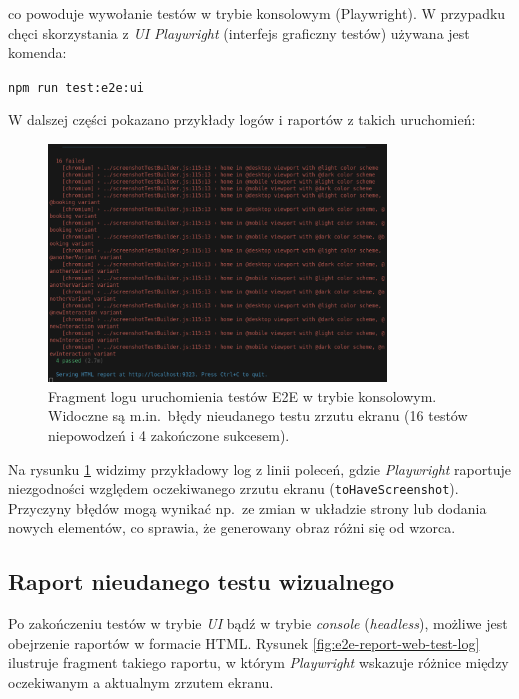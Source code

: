 \documentclass[12pt]{report}
\begin{document}
co powoduje wywołanie testów w trybie konsolowym (Playwright). W przypadku chęci skorzystania z \emph{UI} \emph{Playwright} (interfejs graficzny testów) używana jest komenda:

\begin{center}
\texttt{npm run test:e2e:ui}
\end{center}

W dalszej części pokazano przykłady logów i raportów z takich uruchomień:

\begin{figure}[H]
\centering
\includegraphics[width=0.80\textwidth]{e2e_console_test_log.png}
\caption{Fragment logu uruchomienia testów E2E w trybie konsolowym. Widoczne są m.in.\ błędy nieudanego testu zrzutu ekranu (16 testów niepowodzeń i 4 zakończone sukcesem).}
\label{fig:e2e-console-test-log}
\end{figure}

Na rysunku \ref{fig:e2e-console-test-log} widzimy przykładowy log z linii poleceń, gdzie \emph{Playwright} raportuje niezgodności względem oczekiwanego zrzutu ekranu (\texttt{toHaveScreenshot}). Przyczyny błędów mogą wynikać np.\ ze zmian w układzie strony lub dodania nowych elementów, co sprawia, że generowany obraz różni się od wzorca.

\subsection*{Raport nieudanego testu wizualnego}
Po zakończeniu testów w trybie \emph{UI} bądź w trybie \emph{console} (\emph{headless}), możliwe jest obejrzenie raportów w formacie HTML. Rysunek \ref{fig:e2e-report-web-test-log} ilustruje fragment takiego raportu, w którym \emph{Playwright} wskazuje różnice między oczekiwanym a aktualnym zrzutem ekranu.
\end{document}
